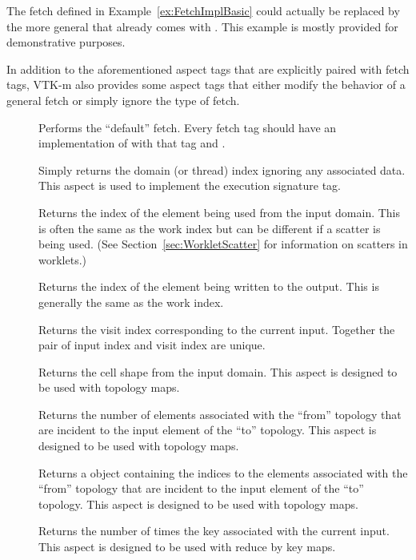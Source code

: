 
\begin{didyouknow}
  The fetch defined in Example~\ref{ex:FetchImplBasic} could actually be replaced by the more general  that already comes with \VTKm.
  This example is mostly provided for demonstrative purposes.
\end{didyouknow}

In addition to the aforementioned aspect tags that are explicitly paired
with fetch tags, VTK-m also provides some aspect tags that either modify
the behavior of a general fetch or simply ignore the type of fetch.

\begin{description}
\item[] 
  Performs the ``default'' fetch.
  Every fetch tag should have an implementation of  with that tag and .
\item[]  Simply
  returns the domain (or thread) index ignoring any associated data. This
  aspect is used to implement the  execution signature
  tag.
\item[] 
  Returns the index of the element being used from the input domain.
  This is often the same as the work index but can be different if a scatter is being used.
  (See Section~\ref{sec:WorkletScatter} for information on scatters in worklets.)
\item[] 
  Returns the index of the element being written to the output.
  This is generally the same as the work index.
\item[] 
  Returns the visit index corresponding to the current input.
  Together the pair of input index and visit index are unique.
\item[] 
  Returns the cell shape from the input domain.
  This aspect is designed to be used with topology maps.
\item[] 
  Returns the number of elements associated with the ``from'' topology that are incident to the input element of the ``to'' topology.
  This aspect is designed to be used with topology maps.
\item[] 
  Returns a \Veclike object containing the indices to the elements associated with the ``from'' topology that are incident to the input element of the ``to'' topology.
  This aspect is designed to be used with topology maps.
\item[] 
  Returns the number of times the key associated with the current input.
  This aspect is designed to be used with reduce by key maps.
\end{description}

